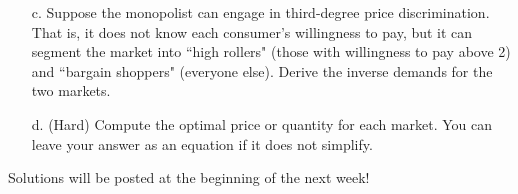 \documentclass{article}
\begin{document}
\begin{enumerate}
\begin{enumerate}
        \vspace{4cm}
        
        \item[c.] Suppose the monopolist can engage in third-degree price discrimination. That is, it does not know each consumer's willingness to pay, but it can segment the market into ``high rollers" (those with willingness to pay above 2) and ``bargain shoppers" (everyone else). Derive the inverse demands for the two markets.
        
        \vspace{4cm}
        
        \item[d.] (Hard) Compute the optimal price or quantity for each market. You can leave your answer as an equation if it does not simplify.
        
        \vspace{4cm}
        
    \end{enumerate}
\end{enumerate}

Solutions will be posted at the beginning of the next week!
\end{document}
